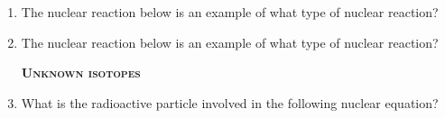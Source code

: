 \documentclass[main.tex]{subfiles}
\begin{document}
\begin{multicols*}{2}
\begin{enumerate}
\item The nuclear reaction below is an example of what type of nuclear reaction? \\
\begin{center} \end{center}
\begin{enumerate}[label=(\alph*)]
\end{enumerate}

\item The nuclear reaction below is an example of what type of nuclear reaction? \\
\begin{center}\end{center} 
\begin{enumerate}[label=(\alph*)]
\end{enumerate}

{\raggedright\textsc{\textbf{Unknown isotopes }}\par}

\item What is the radioactive particle involved in the following nuclear equation? \\
\begin{center} \end{center} 
\begin{enumerate}[label=(\alph*)]
\end{enumerate}







\end{enumerate}
\end{multicols*}
\end{document}
